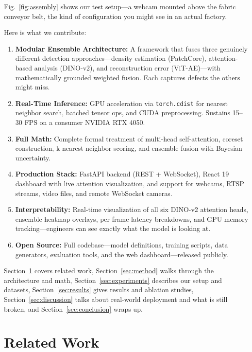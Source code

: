 \documentclass[journal]{IEEEtran}
\begin{document}
Fig.~\ref{fig:assembly} shows our test setup---a webcam mounted above the fabric conveyor belt, the kind of configuration you might see in an actual factory.

Here is what we contribute:

\begin{enumerate}[leftmargin=*,nosep]
    \item \textbf{Modular Ensemble Architecture:} A framework that fuses three genuinely different detection approaches---density estimation (PatchCore), attention-based analysis (DINO-v2), and reconstruction error (ViT-AE)---with mathematically grounded weighted fusion. Each captures defects the others might miss.
    \item \textbf{Real-Time Inference:} GPU acceleration via \texttt{torch.cdist} for nearest neighbor search, batched tensor ops, and CUDA preprocessing. Sustains 15--30 FPS on a consumer NVIDIA RTX 4050.
    \item \textbf{Full Math:} Complete formal treatment of multi-head self-attention, coreset construction, k-nearest neighbor scoring, and ensemble fusion with Bayesian uncertainty.
    \item \textbf{Production Stack:} FastAPI backend (REST + WebSocket), React 19 dashboard with live attention visualization, and support for webcams, RTSP streams, video files, and remote WebSocket cameras.
    \item \textbf{Interpretability:} Real-time visualization of all six DINO-v2 attention heads, ensemble heatmap overlays, per-frame latency breakdowns, and GPU memory tracking---engineers can see exactly what the model is looking at.
    \item \textbf{Open Source:} Full codebase---model definitions, training scripts, data generators, evaluation tools, and the web dashboard---released publicly.
\end{enumerate}

Section~\ref{sec:related} covers related work, Section~\ref{sec:method} walks through the architecture and math, Section~\ref{sec:experiments} describes our setup and datasets, Section~\ref{sec:results} gives results and ablation studies, Section~\ref{sec:discussion} talks about real-world deployment and what is still broken, and Section~\ref{sec:conclusion} wraps up.

\section{Related Work}
\label{sec:related}
\end{document}
